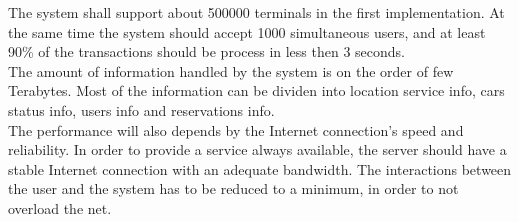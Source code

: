 The system shall support about 500000 terminals in the first implementation. At the same time the system should accept 1000 simultaneous users, and at least 90\% of the transactions should be process in less then 3 seconds.
\\The amount of information handled by the system is on the order of few Terabytes. Most of the information can be dividen into location service info, cars status info, users info and reservations info.
\\The performance will also depends by the Internet connection’s speed and reliability. In order to provide a service always available, the server should have a stable Internet connection with an adequate bandwidth.
The interactions between the user and the system has to be reduced to a minimum, in order to not overload the net. 